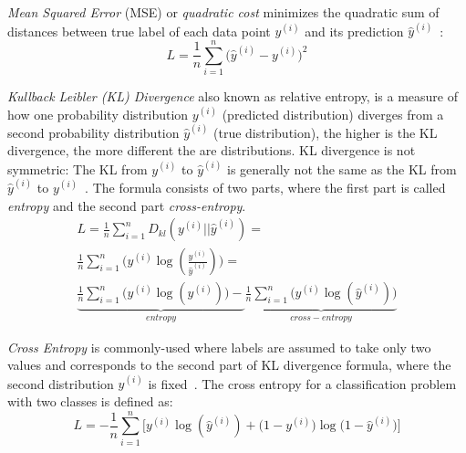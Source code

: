 \begin{inparaenum}
\item \emph{Mean Squared Error} (MSE) or \emph{quadratic cost} minimizes the quadratic sum of distances between true label of each data point $y^{ (i) }$ and its prediction $\hat { y } ^{ (i) }$~: 
\begin{equation}
L=\frac { 1 }{ n } \sum _{ i=1 }^{ n }{ (\hat { y } ^{ (i) }- } y^{ (i) })^{ 2 }
\end{equation}
\item \emph{Kullback Leibler (KL) Divergence} also known as relative entropy, is a measure of how one probability distribution $y^{ (i) }$ (predicted distribution) diverges from a second probability distribution $\hat { y } ^{ (i) }$ (true distribution), the higher is the KL divergence, the more different the are distributions. KL divergence is not symmetric: The KL from $y^{ (i) }$ to $\hat { y } ^{ (i) }$ is generally not the same as the KL from $\hat { y } ^{ (i) }$ to $y^{ (i) }$~. The formula consists of two parts, where the first part is called \emph{entropy} and the second part \emph{cross-entropy}.
\begin{equation}
\begin{split}
L=\frac { 1 }{ n } \sum _{ i=1 }^{ n }{ D_{ kl }(y^{ (i) }||\hat { y } ^{ (i) }) } =\\
 \frac { 1 }{ n } \sum _{ i=1 }^{ n }{ (y^{ (i) }\log{(\frac { y^{ (i) } }{ \hat { y } ^{ (i) } } )) }} =\\
 \underbrace { \frac { 1 }{ n } \sum _{ i=1 }^{ n }{ (y^{ (i) }\log{(y^{ (i) })) }} - }_{ entropy } \underbrace { \frac { 1 }{ n } \sum _{ i=1 }^{ n }{ (y^{ (i) }\log{(\hat { y } ^{ (i) })) }}  }_{ cross-entropy } 
 \end{split}
\end{equation}
\item \emph{Cross Entropy} is commonly-used where labels are assumed to take only two values and corresponds to the second part of KL divergence formula, where the second distribution $\hat { y } ^{ (i) }$ is fixed~. The cross entropy for a classification problem with two classes is defined as:  
\begin{equation}
L=-\frac { 1 }{ n } \sum _{ i=1 }^{ n }{ [y^{ (i) }\log{(\hat { y } ^{ (i) })+(1-  y^{ (i) }}})\log{(1-\hat { y } ^{ (i) }})]
\end{equation}
\end{inparaenum}
